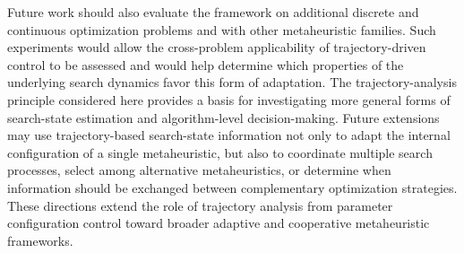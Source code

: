 \documentclass[mathematics,article,accept,moreauthors]{Definitions/mdpi}
\begin{document}
Future work should also evaluate the framework on additional discrete and
continuous optimization problems and with other metaheuristic families.
Such experiments would allow the cross-problem applicability of
trajectory-driven control to be assessed and would help determine which
properties of the underlying search dynamics favor this form of adaptation. The trajectory-analysis principle considered here provides a basis
for investigating more general forms of search-state estimation and
algorithm-level decision-making. Future extensions may use trajectory-based
search-state information not only to adapt the internal configuration of a
single metaheuristic, but also to coordinate multiple search processes,
select among alternative metaheuristics, or determine when information
should be exchanged between complementary optimization strategies. These
directions extend the role of trajectory analysis from parameter
configuration control toward broader adaptive and cooperative
metaheuristic frameworks.


\vspace{6pt} 




\end{document}
